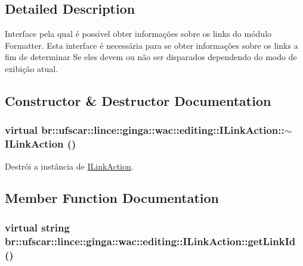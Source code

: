 \subsection{Detailed Description}
Interface pela qual é possivel obter informações sobre os links do módulo Formatter. Esta interface é necessária para se obter informações sobre os links a fim de determinar Se eles devem ou não ser disparados dependendo do modo de exibição atual. 

\subsection{Constructor \& Destructor Documentation}
\hypertarget{classbr_1_1ufscar_1_1lince_1_1ginga_1_1wac_1_1editing_1_1ILinkAction_a20701ec352726a2f7beccbb3cd67e937}{
\subsubsection[{$\sim$ILinkAction}]{\setlength{\rightskip}{0pt plus 5cm}virtual br::ufscar::lince::ginga::wac::editing::ILinkAction::$\sim$ILinkAction ()}}
\label{classbr_1_1ufscar_1_1lince_1_1ginga_1_1wac_1_1editing_1_1ILinkAction_a20701ec352726a2f7beccbb3cd67e937}


Destrói a instância de \hyperlink{classbr_1_1ufscar_1_1lince_1_1ginga_1_1wac_1_1editing_1_1ILinkAction}{ILinkAction}. 



\subsection{Member Function Documentation}
\hypertarget{classbr_1_1ufscar_1_1lince_1_1ginga_1_1wac_1_1editing_1_1ILinkAction_ae7fc2b06a527bfb1a7e1f8485cbc686b}{
\subsubsection[{getLinkId}]{\setlength{\rightskip}{0pt plus 5cm}virtual string br::ufscar::lince::ginga::wac::editing::ILinkAction::getLinkId ()}}
\label{classbr_1_1ufscar_1_1lince_1_1ginga_1_1wac_1_1editing_1_1ILinkAction_ae7fc2b06a527bfb1a7e1f8485cbc686b}


